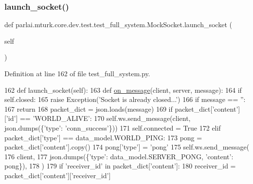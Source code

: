\subsubsection{\texorpdfstring{launch\+\_\+socket()}{launch\_socket()}}
{\footnotesize\ttfamily def parlai.\+mturk.\+core.\+dev.\+test.\+test\+\_\+full\+\_\+system.\+Mock\+Socket.\+launch\+\_\+socket (\begin{DoxyParamCaption}\item[{}]{self }\end{DoxyParamCaption})}



Definition at line 162 of file test\+\_\+full\+\_\+system.\+py.


\begin{DoxyCode}
162     \textcolor{keyword}{def }launch\_socket(self):
163         \textcolor{keyword}{def }\hyperlink{namespaceparlai_1_1chat__service_1_1services_1_1browser__chat_1_1client_a01c1536b48e2f5badd2fe58ea02b9a5c}{on\_message}(client, server, message):
164             \textcolor{keywordflow}{if} self.closed:
165                 \textcolor{keywordflow}{raise} Exception(\textcolor{stringliteral}{'Socket is already closed...'})
166             \textcolor{keywordflow}{if} message == \textcolor{stringliteral}{''}:
167                 \textcolor{keywordflow}{return}
168             packet\_dict = json.loads(message)
169             \textcolor{keywordflow}{if} packet\_dict[\textcolor{stringliteral}{'content'}][\textcolor{stringliteral}{'id'}] == \textcolor{stringliteral}{'WORLD\_ALIVE'}:
170                 self.ws.send\_message(client, json.dumps(\{\textcolor{stringliteral}{'type'}: \textcolor{stringliteral}{'conn\_success'}\}))
171                 self.connected = \textcolor{keyword}{True}
172             \textcolor{keywordflow}{elif} packet\_dict[\textcolor{stringliteral}{'type'}] == data\_model.WORLD\_PING:
173                 pong = packet\_dict[\textcolor{stringliteral}{'content'}].copy()
174                 pong[\textcolor{stringliteral}{'type'}] = \textcolor{stringliteral}{'pong'}
175                 self.ws.send\_message(
176                     client,
177                     json.dumps(\{\textcolor{stringliteral}{'type'}: data\_model.SERVER\_PONG, \textcolor{stringliteral}{'content'}: pong\}),
178                 )
179             \textcolor{keywordflow}{if} \textcolor{stringliteral}{'receiver\_id'} \textcolor{keywordflow}{in} packet\_dict[\textcolor{stringliteral}{'content'}]:
180                 receiver\_id = packet\_dict[\textcolor{stringliteral}{'content'}][\textcolor{stringliteral}{'receiver\_id'}]

\end{DoxyCode}
